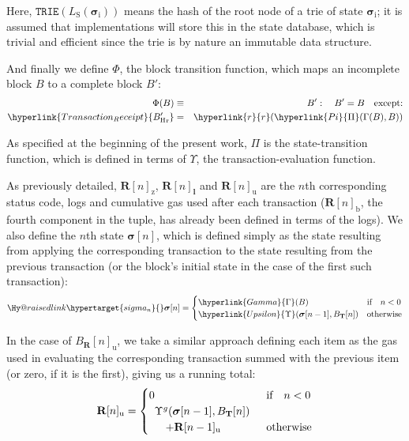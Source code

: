 \documentclass[9pt,oneside]{amsart}
\makeatletter
\newcommand{\linkdest}[1]{\Hy@raisedlink{\hypertarget{#1}{}}}
\makeatother
\begin{document}
\begin{multicols}{2}
Here, $\mathtt{TRIE}(L_{\mathrm{S}}(\boldsymbol{\sigma}_{\mathrm{i}}))$ means the hash of the root node of a trie of state $\boldsymbol{\sigma}_{\mathrm{i}}$; it is assumed that implementations will store this in the state database, which is trivial and efficient since the trie is by nature an immutable data structure.

\hypertarget{Phi}{}And finally we define $\Phi$, the block transition function, which maps an incomplete block $B$ to a complete block $B'$:
\begin{eqnarray}
\Phi(B) & \equiv & B': \quad B' = B \quad \text{except:} \\
{\hyperlink{Transaction_Receipt}{{B'_{\mathrm{H}}}_{\mathrm{r}}}} & = & \hyperlink{r}{r}(\hyperlink{Pi}{\Pi}(\Gamma(B), B))
\end{eqnarray}

As specified at the beginning of the present work, \hyperlink{Pi}{$\Pi$} is the state-transition function, which is defined in terms of \hyperlink{Upsilon_state_transition}{$\Upsilon$}, the transaction-evaluation function.

As previously detailed, $\mathbf{R}[n]_{\mathrm{z}}$, $\mathbf{R}[n]_{\mathbf{l}}$ and $\mathbf{R}[n]_{\mathrm{u}}$ are the $n$th corresponding status code, logs and cumulative gas used after each transaction ($\mathbf{R}[n]_{\mathrm{b}}$, the fourth component in the tuple, has already been defined in terms of the logs). We also define the $n$th state $\boldsymbol{\sigma}[n]$, which is defined simply as the state resulting from applying the corresponding transaction to the state resulting from the previous transaction (or the block's initial state in the case of the first such transaction):
\begin{equation}\linkdest{sigma_n}{}
\boldsymbol{\sigma}[n] = \begin{cases} \hyperlink{Gamma}{\Gamma}(B) & \text{if} \quad n < 0 \\ \hyperlink{Upsilon}{\Upsilon}(\boldsymbol{\sigma}[n - 1], B_{\mathbf{T}}[n]) & \text{otherwise} \end{cases}
\end{equation}

In the case of $B_{\mathbf{R}}[n]_{\mathrm{u}}$, we take a similar approach defining each item as the gas used in evaluating the corresponding transaction summed with the previous item (or zero, if it is the first), giving us a running total:
\begin{equation}
\mathbf{R}[n]_{\mathrm{u}} = \begin{cases} 0 & \text{if} \quad n < 0 \\
\begin{array}[b]{l}
\Upsilon^g(\boldsymbol{\sigma}[n - 1], B_{\mathbf{T}}[n])\\ \quad + \mathbf{R}[n-1]_{\mathrm{u}}
\end{array}
 & \text{otherwise} \end{cases}
\end{equation}


\end{multicols}
\end{document}
